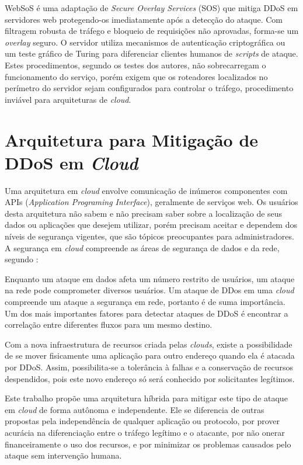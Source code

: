 \documentclass[a4paper, 12pt]{article}
\begin{document}
WebSoS \cite{Stavrou:2005:WOS:1090583.1648614} é uma adaptação de \emph{Secure Overlay Services} (SOS) \cite{Keromytis:2002:SSO:964725.633032} que mitiga DDoS em servidores web protegendo-os imediatamente após a detecção do ataque. Com filtragem robusta de tráfego e bloqueio de requisições não aprovadas, forma-se um \emph{overlay} seguro. O servidor utiliza mecanismos de autenticação criptográfica ou um teste gráfico de Turing \cite{Dietrich00analyzingdistributed} para diferenciar clientes humanos de \emph{scripts} de ataque. Estes procedimentos, segundo os testes dos autores, não sobrecarregam o funcionamento do serviço, porém exigem que os roteadores localizados no perímetro do servidor sejam configurados para controlar o tráfego, procedimento inviável para arquiteturas de \emph{cloud}.
 



\section{Arquitetura para Mitigação de DDoS em \emph{Cloud}}


Uma arquitetura em \emph{cloud} envolve comunicação de inúmeros componentes com APIs (\emph{Application Programing Interface}), geralmente de serviços web. Os usuários desta arquitetura não sabem e não precisam saber sobre a localização de seus dados ou aplicações que desejem utilizar, porém precisam aceitar e dependem  dos níveis de segurança vigentes, que são tópicos preocupantes para administradores.
A segurança em \emph{cloud} compreende as áreas de segurança de dados e da rede, segundo \cite{Dhage:2011:IDS:1980022.1980076}:  

Enquanto um ataque em dados afeta um número restrito de usuários, um ataque na rede pode comprometer diversos usuários. Um ataque de DDos em uma \emph{cloud} compreende um ataque a segurança em rede, portanto é de suma importância. 
Um dos mais importantes fatores para detectar ataques de DDoS é encontrar a correlação entre diferentes fluxos para um mesmo destino.

Com a nova infraestrutura de recursos criada pelas \emph{clouds}, existe a possibilidade de se mover fisicamente uma aplicação para outro endereço quando ela é atacada por DDoS. Assim, possibilita-se a tolerância à falhas e a conservação de recursos despendidos, pois este novo endereço só será conhecido por solicitantes legítimos.

Este trabalho propõe uma arquitetura híbrida para mitigar este tipo de ataque em \emph{cloud} de forma autônoma e independente. Ele se diferencia de outras propostas pela independência de qualquer aplicação ou protocolo, por prover acurácia na diferenciação entre o tráfego legítimo e o atacante, por não onerar financeiramente o uso dos recursos, e por minimizar os problemas causados pelo ataque sem intervenção humana.
\end{document}
